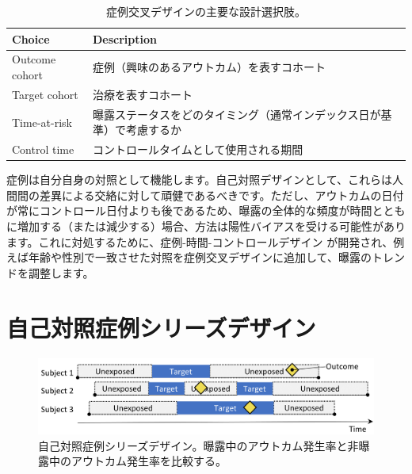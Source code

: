\documentclass[
  11pt]{book}
\theoremstyle{definition}
\theoremstyle{definition}
\theoremstyle{definition}
\theoremstyle{definition}
\theoremstyle{remark}
\begin{document}
\begin{table}
\centering
\caption{\label{tab:ccrChoices}症例交叉デザインの主要な設計選択肢。}
\centering
\begin{tabular}[t]{l>{\raggedright\arraybackslash}p{9cm}}
\toprule
Choice & Description\\
\midrule
Outcome cohort & 症例（興味のあるアウトカム）を表すコホート\\
Target cohort & 治療を表すコホート\\
Time-at-risk & 曝露ステータスをどのタイミング（通常インデックス日が基準）で考慮するか\\
Control time & コントロールタイムとして使用される期間\\
\bottomrule
\end{tabular}
\end{table}

症例は自分自身の対照として機能します。自己対照デザインとして、これらは人間間の差異による交絡に対して頑健であるべきです。ただし、アウトカムの日付が常にコントロール日付よりも後であるため、曝露の全体的な頻度が時間とともに増加する（または減少する）場合、方法は陽性バイアスを受ける可能性があります。これに対処するために、症例-時間-コントロールデザイン \citep[ ]{suissa_1995} が開発され、例えば年齢や性別で一致させた対照を症例交叉デザインに追加して、曝露のトレンドを調整します。

\section{自己対照症例シリーズデザイン}\label{ux81eaux5df1ux5bfeux7167ux75c7ux4f8bux30b7ux30eaux30fcux30baux30c7ux30b6ux30a4ux30f3}


\begin{figure}[h]

{\centering \includegraphics[width=0.9\linewidth]{images/PopulationLevelEstimation/selfControlledCaseSeries} 

}

\caption{自己対照症例シリーズデザイン。曝露中のアウトカム発生率と非曝露中のアウトカム発生率を比較する。}\label{fig:selfControlledCaseSeries}
\end{figure}
\end{document}
